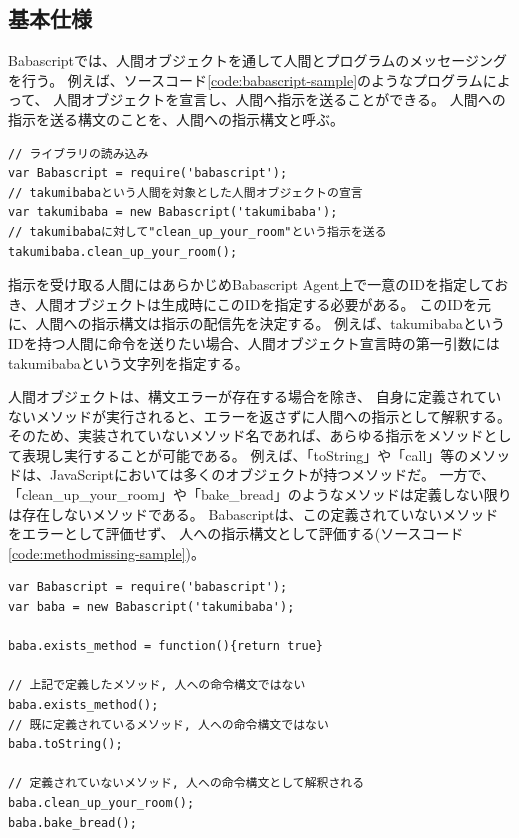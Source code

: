 \subsection{基本仕様}\label{ux57faux672cux4ed5ux69d8}

Babascriptでは、人間オブジェクトを通して人間とプログラムのメッセージングを行う。
例えば、ソースコード\ref{code:babascript-sample}のようなプログラムによって、
人間オブジェクトを宣言し、人間へ指示を送ることができる。
人間への指示を送る構文のことを、人間への指示構文と呼ぶ。

\begin{lstlisting}[caption=人への指示構文, label=code:babascript-sample]
// ライブラリの読み込み
var Babascript = require('babascript');
// takumibabaという人間を対象とした人間オブジェクトの宣言
var takumibaba = new Babascript('takumibaba');
// takumibabaに対して"clean_up_your_room"という指示を送る
takumibaba.clean_up_your_room();
\end{lstlisting}

指示を受け取る人間にはあらかじめBabascript
Agent上で一意のIDを指定しておき、人間オブジェクトは生成時にこのIDを指定する必要がある。
このIDを元に、人間への指示構文は指示の配信先を決定する。
例えば、takumibabaというIDを持つ人間に命令を送りたい場合、人間オブジェクト宣言時の第一引数にはtakumibabaという文字列を指定する。

人間オブジェクトは、構文エラーが存在する場合を除き、
自身に定義されていないメソッドが実行されると、エラーを返さずに人間への指示として解釈する。
そのため、実装されていないメソッド名であれば、あらゆる指示をメソッドとして表現し実行することが可能である。
例えば、「toString」や「call」等のメソッドは、JavaScriptにおいては多くのオブジェクトが持つメソッドだ。
一方で、「clean\_up\_your\_room」や「bake\_bread」のようなメソッドは定義しない限りは存在しないメソッドである。
Babascriptは、この定義されていないメソッドをエラーとして評価せず、
人への指示構文として評価する(ソースコード\ref{code:methodmissing-sample})。

\begin{lstlisting}[caption=通常のメソッドと指示構文の例, label=code:methodmissing-sample]
var Babascript = require('babascript');
var baba = new Babascript('takumibaba');

baba.exists_method = function(){return true}

// 上記で定義したメソッド, 人への命令構文ではない
baba.exists_method();
// 既に定義されているメソッド, 人への命令構文ではない
baba.toString();

// 定義されていないメソッド, 人への命令構文として解釈される
baba.clean_up_your_room();
baba.bake_bread();
\end{lstlisting}

